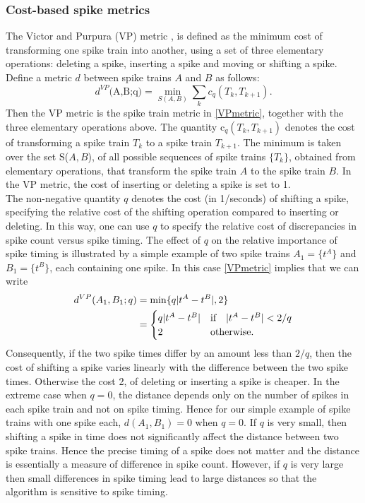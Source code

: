\subsubsection{Cost-based spike metrics}
The Victor and Purpura (VP) metric \cite{Victor1996, Victor1998}, is defined as the minimum cost of transforming one spike train into another, using a set of three elementary operations:
deleting a spike, inserting a spike and moving or shifting a spike. Define a metric $d$ between spike trains $A$ and $B$ as follows:
\begin{equation}\label{VPmetric}
\text{$d^{VP}$(A,B;q)} = \displaystyle \min_{S(A,B)} \sum_{k} c_{q}(T_{k}, T_{k+1}). 
\end{equation} 
Then the VP metric is the spike train metric in \eqref{VPmetric}, together with the three elementary operations above.
The quantity c$_{q}(T_{k},T_{k+1})$ denotes the cost of transforming a spike train $T_{k}$ to a spike train $T_{k+1}$. The minimum is taken over the set S($A,B$), of all possible sequences of spike trains $\{T_{k}\}$, obtained from elementary operations, that transform the spike train $A$ to the spike train $B$.
In the VP metric, the cost of inserting or deleting a spike is set to 1.\\

The non-negative quantity $q$ denotes the cost (in 1/seconds) of shifting a spike, specifying the relative cost of the shifting operation compared to inserting or deleting. In this way, one can use $q$ to specify the relative cost of discrepancies in spike count versus spike timing.
The effect of $q$ on the relative importance of spike timing is illustrated by a simple example 
of two spike trains $A_1 = \{t^A\}$ and $B_1 = \{t^B\}$, each containing one spike.
In this case \eqref{VPmetric} implies that we can write 
\begin{align*}
d^{VP}(A_1,B_1;q) &= \displaystyle \min \{ q\lvert t^{A} - t^{B}\rvert,  2 \}\\
  &= \begin{cases} 
       q\lvert t^{A} - t^{B}\rvert & \text{if} \quad  \lvert t^{A} - t^{B}\rvert < 2/q \\
2 & \text{otherwise}.        
\end{cases}
\end{align*}
Consequently, if the two spike times differ by an amount less than $2/q$, then the cost of shifting a spike varies linearly with the difference between the two spike times. Otherwise
the cost 2, of deleting or inserting a spike is cheaper. In the extreme case when $q=0$, the distance depends only on the number of spikes in each spike train and not on spike timing.
Hence for our simple example of spike trains with one spike each, $d(A_1,B_1) = 0$ when $q = 0.$
If $q$ is very small, then shifting a spike in time does not significantly affect the distance between two spike trains. Hence the precise timing of a spike does not matter and the distance is
essentially a measure of difference in spike count.
However, if $q$ is very large then small differences in spike timing lead to large distances so that the algorithm is sensitive to spike timing.\\

